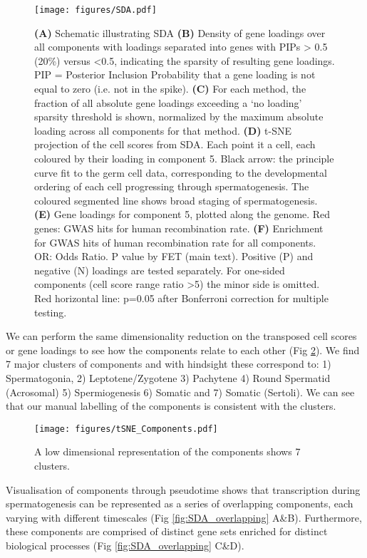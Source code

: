 \begin{figure}[H]
	\centering
	\texttt{[image: figures/SDA.pdf]}
	\caption{
		\textbf{(A)} Schematic illustrating SDA
		\textbf{(B)} Density of gene loadings over all components with loadings separated into genes with PIPs > 0.5 (20\%) versus <0.5, indicating the sparsity of resulting gene loadings. PIP = Posterior Inclusion Probability that a gene loading is not equal to zero (i.e. not in the spike).
		\textbf{(C)} For each method, the fraction of all absolute gene loadings exceeding a ‘no loading’ sparsity threshold is shown, normalized by the maximum absolute loading across all components for that method. 
		\textbf{(D)} t-SNE projection of the cell scores from SDA. Each point it a cell, each coloured by their loading in component 5. Black arrow: the principle curve fit to the germ cell data, corresponding to the developmental ordering of each cell progressing through spermatogenesis. The coloured segmented line shows broad staging of spermatogenesis.
		\textbf{(E)} Gene loadings for component 5, plotted along the genome. Red genes: GWAS hits for human recombination rate.
		\textbf{(F)} Enrichment for GWAS hits of human recombination rate for all components. OR: Odds Ratio. P value by FET (main text). Positive (P) and negative (N) loadings are tested separately. For one-sided components (cell score range ratio >5) the minor side is omitted. Red horizontal line: p=0.05 after Bonferroni correction for multiple testing.
	}
	\label{fig:SDA}
\end{figure}

We can perform the same dimensionality reduction on the transposed cell scores or gene loadings to see how the components relate to each other (Fig \ref{fig:tSNE_Components}). We find 7 major clusters of components and with hindsight these correspond to: 1) Spermatogonia, 2) Leptotene/Zygotene 3) Pachytene 4) Round Spermatid (Acrosomal) 5) Spermiogenesis 6) Somatic and 7) Somatic (Sertoli). We can see that our manual labelling of the components is consistent with the clusters.

\begin{figure}[H]
	\centering
	\texttt{[image: figures/tSNE\_Components.pdf]}
	\caption{A low dimensional representation of the components shows 7 clusters.}
	\label{fig:tSNE_Components}
\end{figure}

Visualisation of components through pseudotime shows that transcription during spermatogenesis can be represented as a series of overlapping components, each varying with different timescales (Fig \ref{fig:SDA_overlapping} A\&B). Furthermore, these components are comprised of distinct gene sets enriched for distinct biological processes (Fig \ref{fig:SDA_overlapping} C\&D).

